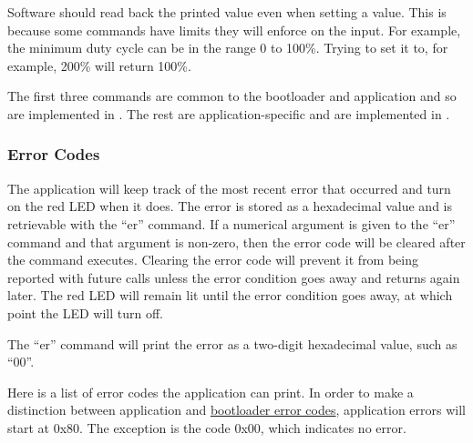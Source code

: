\documentclass{article}
\begin{document}
Software should read back the printed value even when setting a value.  This is because some
commands have limits they will enforce on the input.  For example, the minimum duty cycle can be in
the range 0 to 100\%.  Trying to set it to, for example, 200\% will return 100\%.

The first three commands are common to the bootloader and application and so are implemented in
.  The rest are application-specific and are implemented in
.

\subsubsection{Error Codes} \label{sssec:FWAppErrCodes}
The application will keep track of the most recent error that occurred and turn on the red LED when
it does.  The error is stored as a hexadecimal value and is retrievable with the ``er'' command.
If a numerical argument is given to the ``er'' command and that argument is non-zero, then the error
code will be cleared after the command executes.  Clearing the error code will prevent it from being
reported with future calls unless the error condition goes away and returns again later.  The red
LED will remain lit until the error condition goes away, at which point the LED will turn off.

The ``er'' command will print the error as a two-digit hexadecimal value, such as ``00''.

Here is a list of error codes the application can print.  In order to make a distinction between
application and \hyperref[tab:FWBootErrors]{bootloader error codes}, application errors will start
at 0x80.  The exception is the code 0x00, which indicates no error.
\end{document}
